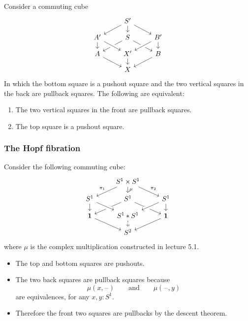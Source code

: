 \documentclass[handout]{beamer}
\newcommand{\unit}{\mathbf{1}}
\newcommand{\sphere}[1]{S^{#1}}
\newcommand{\blank}{\mathord{\hspace{1pt}\text{--}\hspace{1pt}}}
\begin{document}
\begin{frame}
  \begin{theorem}
    Consider a commuting cube
    \begin{equation*}
      \begin{tikzcd}[ampersand replacement=\&,row sep=small]
        \& S' \arrow[dl] \arrow[d] \arrow[dr] \\
        A' \arrow[d] \& S \arrow[dl] \arrow[dr] \& B' \arrow[dl,crossing over] \arrow[d] \\
        A \arrow[dr] \& X' \arrow[from=ul,crossing over] \arrow[d] \& B \arrow[dl] \\
        \& X
      \end{tikzcd}
    \end{equation*}
    In which the bottom square is a pushout square and the two vertical squares in the back are pullback squares. The following are equivalent:
    \begin{enumerate}
    \item The two vertical squares in the front are pullback squares.
    \item The top square is a pushout square.
    \end{enumerate}
  \end{theorem}
\end{frame}

\begin{frame}
  \frametitle{The Hopf fibration}
  Consider the following commuting cube:
  \begin{equation*}
    \begin{tikzcd}[ampersand replacement=\&,row sep=small]
      \& \sphere{1}\times\sphere{1} \arrow[dl,swap,"\pi_1"] \arrow[d,"\mu"] \arrow[dr,"\pi_2"] \\
      \sphere{1} \arrow[d] \& \sphere{1} \arrow[dl] \arrow[dr] \& \sphere{1} \arrow[dl,crossing over] \arrow[d] \\
      \unit \arrow[dr] \& \sphere{1}\ast\sphere{1} \arrow[from=ul,crossing over] \arrow[d,dashed] \& \unit \arrow[dl] \\
      \& \sphere{2}
    \end{tikzcd}
  \end{equation*}
  where $\mu$ is the complex multiplication constructed in lecture 5.1.
  \begin{itemize}
  \item The top and bottom squares are pushouts.
  \item The two back squares are pullback squares because
    \begin{equation*}
      \mu(x,\blank)\qquad\text{and}\qquad\mu(\blank,y)
    \end{equation*}
    are equivalences, for any $x,y:\sphere{1}$.
  \item Therefore the front two squares are pullbacks by the descent theorem.
  \end{itemize}
\end{frame}
\end{document}
